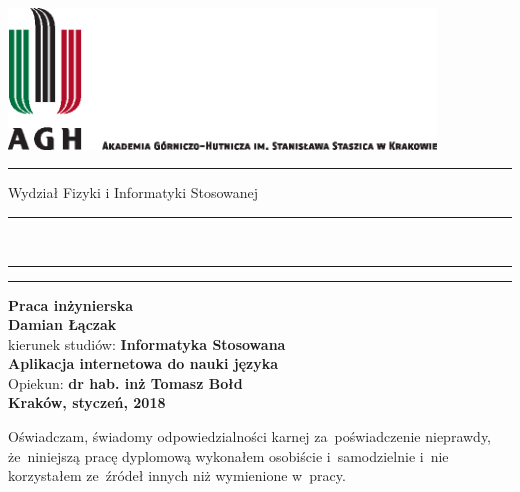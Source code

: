 \documentclass[11pt]{aghdpl}
\author{TODO: Damian Łączak}
\date{2018}
\begin{document}

\thispagestyle{empty}

\includegraphics[height=37.5mm]{images/agh_nzw_a_pl_1w_wbr_cmyk}\\
\rule{30mm}{0pt}
{\Large\textsf{Wydział Fizyki i Informatyki Stosowanej}}\\
\rule{\textwidth}{3pt}\\
\rule[2.75ex]
{\textwidth}{1pt}%
\vspace{1em}\rule{30mm}{0pt}
\begin{center}
    {\bf\huge\textsf{Praca inżynierska}}\\
    \vspace{13ex}
    {\bf\LARGE\textsf{Damian Łączak}}\\
    \vspace{3ex}
    {\sf \normalsize kierunek studiów:} {\bf\normalsize\textsf{Informatyka Stosowana}}\\
    \vspace{15ex}
    {\bf\Huge\textsf{Aplikacja internetowa do nauki języka}}\\
    \vspace{14ex}
    {\sf \LARGE Opiekun:} {\bf\LARGE\textsf{dr hab. inż Tomasz Bołd}}\\
    \vspace{22ex}
    \textsf{\bf\Large\textsf{Kraków, styczeń, 2018}}
\end{center}

\newpage

{\sf Oświadczam, świadomy odpowiedzialności karnej za~poświadczenie nieprawdy, że~niniejszą pracę dyplomową wykonałem osobiście i~samodzielnie i~nie korzystałem ze~źródeł innych niż wymienione w~pracy.}
\end{document}
